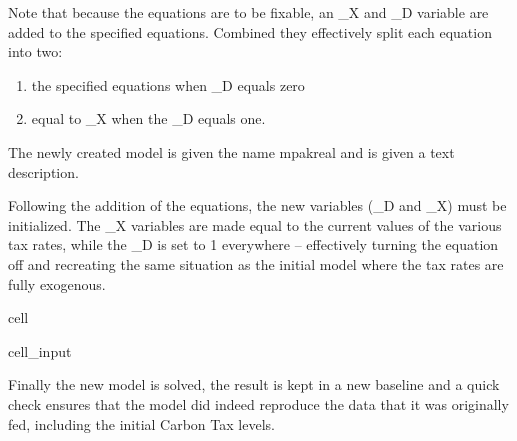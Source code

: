 \documentclass[letterpaper,10pt,english]{jupyterBook}
\begin{document}
\sphinxAtStartPar
Note that because the equations are to be fixable, an \_X and \_D variable are added to the specified equations. Combined they effectively split each equation into  two:
\begin{enumerate}
%
\item {} 
\sphinxAtStartPar
the specified equations when \_D equals zero

\item {} 
\sphinxAtStartPar
equal to \_X when the \_D equals one.

\end{enumerate}

\sphinxAtStartPar
The newly created model is given the name mpakreal and is given a text description.

\sphinxAtStartPar
Following the addition of the equations, the new variables (\_D and \_X) must be initialized. The \_X variables are made equal to the current values of the various tax rates, while the \_D is set to 1 everywhere – effectively turning the equation off and re\sphinxhyphen{}creating the same situation as the initial model where the tax rates are fully exogenous.

\begin{sphinxuseclass}{cell}\begin{sphinxVerbatimInput}

\begin{sphinxuseclass}{cell_input}
\begin{sphinxVerbatim}[commandchars=\\\{\}]

  

  
\end{sphinxVerbatim}

\end{sphinxuseclass}\end{sphinxVerbatimInput}

\end{sphinxuseclass}
\sphinxAtStartPar
Finally the new model is solved, the result is kept in a new baseline and a quick check ensures that the model did indeed reproduce the data that it was originally fed, including the initial Carbon Tax levels.
\end{document}
